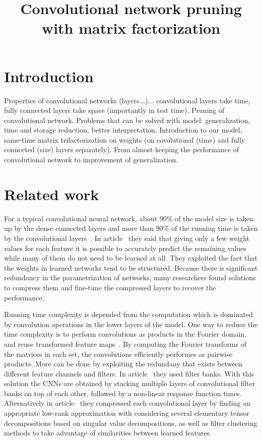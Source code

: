 \documentclass{article} %
\title{Convolutional network pruning with matrix factorization}
\begin{document}
\maketitle

\begin{abstract}

\end{abstract}

\section{Introduction}
Properties of convolutional networks (layers...)... convolutional layers take 
time, fully connected layers take space (importantly in test time). Pruning of 
convolutional network. Problems that can be solved with model: generalization, 
time and storage reduction, better interpretation. Introduction to our model, 
same-time matrix trifactorization on weights (on covolutional (time) and fully 
connected (size) layers separately). From almost keeping the performance of 
convolutional network to improvement of generalization.


\section{Related work}

For a typical convolutional neural network, about 90\% of the model size is 
taken up by the dense connected layers and more than 90\% of the running time is 
taken by the convolutional layers~\cite{zeiler2014visualizing}. In 
article~\cite{denil2013predicting} they said that giving only a few weight 
values for each feature it is possible to accurately predict the remaining 
values while many of them do not need to be learned at all. They exploited the 
fact that the weights in learned networks tend to be structured. Because there 
is significant redundancy in the parametrization of networks, many researchers 
found solutions to compress them and fine-tune the compressed layers to recover 
the performance. 


Running time complexity is depended from the computation which is dominated by 
convolution operations in the lower layers of the model. One way to reduce the 
time complexity is to perform convolutions as products in the Fourier domain, 
and reuse transformed feature maps~\cite{mathieu2013fast}. By computing the 
Fourier transforms of the matrices in each set, the convolutions efficiently 
performes as pairwise products. More can be done by exploiting the redundany 
that exists between different feature channels and filters. In 
article~\cite{jaderberg2014speeding} they used filter banks. With this solution 
the CNNs are obtained by stacking multiple layers of convolutional filter banks 
on top of each other, followed by a non-linear response function times. 
Alternatively in article~\cite{denton2014exploiting} they compressed each 
convolutional layer by finding an appropriate low-rank approximation with 
considering several elementary tensor decompositions based on singular value 
decompositions, as well as filter clustering methods to take advantage of 
similarities between learned features.
\end{document}
